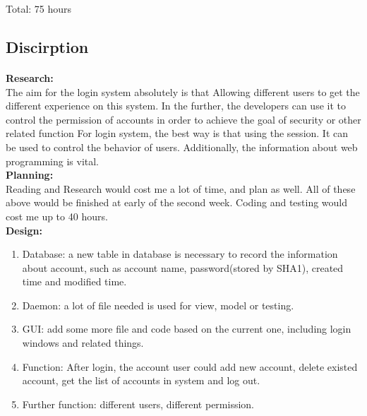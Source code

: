 \documentclass[10pt,a4,oneside]{article}
\begin{document}
Total:  75 hours\\

\subsection*{Discirption}

\paragraph{}
\textbf{Research:}\\
The aim for the login system absolutely is that Allowing different users to get the different experience on this system. In the further, the developers can use it to control the permission of accounts in order to achieve the goal of security or other related function For login system, the best way is that using the session. It can be used to control the behavior of users.  Additionally, the information about web programming is vital.\\

\textbf{Planning:}\\
Reading and Research would cost me a lot of time, and plan as well. All of these above would be finished at early of the second week. Coding and testing would cost me up to 40 hours.\\

\textbf{Design:}\\
\begin{enumerate}
 \item Database: a new table in database is necessary to record the information about account, such as account name, password(stored by SHA1), created time and modified time. \\
\item Daemon: a lot of file needed is used for view, model or testing. \\
\item GUI: add some more file and code based on the current one, including login windows and related things.\\
\item Function: After login, the account user could add new account, delete existed account, get the list of accounts in system and log out.\\
\item Further function: different users, different permission. 
\end{enumerate}
\end{document}
